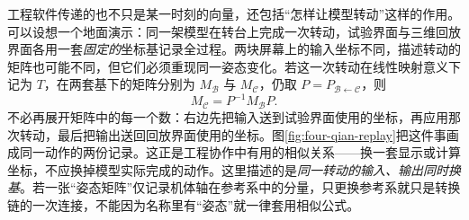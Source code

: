 \documentclass[a4paper,12pt,twoside,openany,fontset=none]{ctexbook}
\numberwithin{equation}{chapter}
\begin{document}
工程软件传递的也不只是某一时刻的向量，还包括“怎样让模型转动”这样的作用。可以设想一个地面演示：同一架模型在转台上完成一次转动，试验界面与三维回放界面各用一套\emph{固定的}坐标基记录全过程。两块屏幕上的输入坐标不同，描述转动的矩阵也可能不同，但它们必须重现同一姿态变化。若这一次转动在线性映射意义下记为 $T$，在两套基下的矩阵分别为 $M_{\mathcal B}$ 与 $M_{\mathcal C}$，仍取 $P=P_{\mathcal B\leftarrow\mathcal C}$，则
\begin{equation}
 M_{\mathcal C}=P^{-1}M_{\mathcal B}P.
 \label{eq:four-engineering-similarity}
\end{equation}
不必再展开矩阵中的每一个数：右边先把输入送到试验界面使用的坐标，再应用那次转动，最后把输出送回回放界面使用的坐标。图\ref{fig:four-qian-replay}把这件事画成同一动作的两份记录。这正是工程协作中有用的相似关系——换一套显示或计算坐标，不应换掉模型实际完成的动作。这里描述的是\emph{同一转动的输入、输出同时换基}。若一张“姿态矩阵”仅记录机体轴在参考系中的分量，只更换参考系就只是转换链的一次连接，不能因为名称里有“姿态”就一律套用相似公式。\cite{zanetti-rotations-2019}
\end{document}
